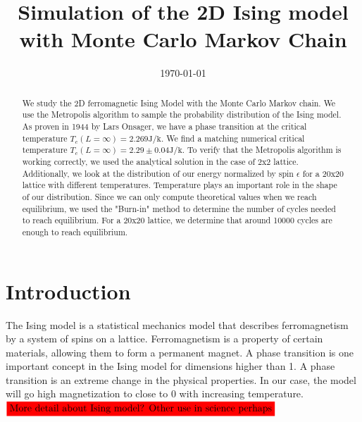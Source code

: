 \documentclass[english,notitlepage,reprint,nofootinbib]{revtex4-2}  %
\begin{document}
	
	\title{Simulation of the 2D Ising model with Monte Carlo Markov Chain}  %
	\author{} %
	\date{\today}                             %
	\noaffiliation                            %
	
	\begin{abstract}
We study the 2D ferromagnetic Ising Model with the Monte Carlo Markov chain. We
use the Metropolis algorithm to sample the probability distribution of the Ising
model.
	As proven in 1944 by Lars Onsager\cite{PhysRev.65.117}, we have a phase
transition at the critical temperature $T_c(L=\infty)=2.269 \mathrm{J / k}$. We
find a matching numerical critical temperature
$T_c(L=\infty) = 2.29 \pm 0.04 \mathrm{J / k}$. To verify that the Metropolis
algorithm is working correctly, we used the analytical solution in the case  of
2x2 lattice. Additionally, we look at the distribution of our energy normalized
by spin $\epsilon$ for a 20x20 lattice with different temperatures. Temperature plays an important role in the shape of our distribution. Since
we can only compute theoretical values when we reach equilibrium, we used the
"Burn-in"  method to determine the number of cycles needed to reach equilibrium.
For a 20x20 lattice, we determine that around 10000 cycles are enough to reach
equilibrium.
\end{abstract}
	\maketitle	
	
	
	\section{Introduction} \label{sec:introduction}
	The Ising model is a statistical mechanics model that describes ferromagnetism by a system of spins on a lattice.
	Ferromagnetism is a property of certain materials, allowing them to form a permanent magnet. A phase transition is one important concept in the Ising model for dimensions
	higher than 1. A phase transition is an extreme change in the physical properties. In our case, the model will go high magnetization to close to
	0 with increasing temperature. $\colorbox{red}{More detail about Ising model? Other use in science perhaps}$\\
\end{document}
